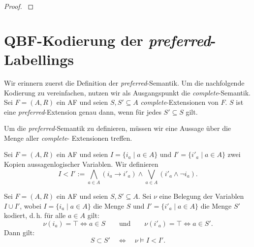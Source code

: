 \begin{proof}
    \label{pr:ind-pr-is-pi3p-c-correct}
\end{proof}

\section{QBF-Kodierung der \textit{preferred}-Labellings}
Wir erinnern zuerst die Definition der \textit{preferred}-Semantik. Um die nachfolgende Kodierung 
zu vereinfachen, 
nutzen wir als Ausgangspunkt die \textit{complete}-Semantik. Sei \(F=(A,R)\) ein AF 
und seien \(S, S' \subseteq A\) \textit{complete}-Extensionen von \(F\). $S$ ist eine \textit{preferred}-Extension
genau dann, wenn für jedes $S' \subseteq S$ gilt.

Um die \textit{preferred}-Semantik zu definieren, müssen wir eine Aussage über die Menge aller \textit{complete}-
Extensionen treffen. 

\begin{Definition}
    \label{def:lt-pl}
    Sei \(F=(A,R)\) ein AF und seien
    \(I=\{i_a\mid a\in A\}\) und \(I'=\{i'_a\mid a\in A\}\)
    zwei Kopien aussagenlogischer Variablen. Wir definieren
    \[
        I < I'
        :=
            \bigwedge_{a\in A}(i_a \rightarrow i'_a)
        \land
            \bigvee_{a\in A}(i'_a \land \neg i_a).
    \]
\end{Definition}

\begin{Lemma}
    \label{lem:lt-pl-correct}
    Sei \(F=(A,R)\) ein AF und seien \(S,S'\subseteq A\).
    Sei \(\nu\) eine Belegung der Variablen \(I\cup I'\), wobei
    \(I=\{i_a\mid a\in A\}\) die Menge \(S\) und
    \(I'=\{i'_a\mid a\in A\}\) die Menge \(S'\) kodiert, d.\,h. für alle
    \(a\in A\) gilt:
    \[
        \nu(i_a)=\top \Longleftrightarrow a\in S
        \qquad\text{und}\qquad
        \nu(i'_a)=\top \Longleftrightarrow a\in S'.
    \]
    Dann gilt:
    \[
        S \subset S'
        \quad\Longleftrightarrow\quad
        \nu \models I < I'.
    \]
\end{Lemma}

